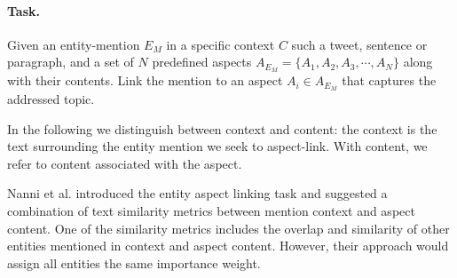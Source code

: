 
\paragraph{\textbf{Task.}} Given an entity-mention $E_M$ in a specific context $C$ such a tweet, sentence or paragraph, and a set of $N$ predefined aspects $A_{E_M} = \{A_1, A_2, A_3, \cdots, A_N\}$ along with their contents. Link the mention to an aspect $A_i \in A_{E_M}$ that captures the addressed topic. 

\bigskip
{}


In the following we distinguish between context and content: the context is the text surrounding the entity mention we seek to aspect-link. With content, we refer to content associated with the aspect.

Nanni et al. \cite{nanni2018entity} introduced the entity aspect linking task and suggested a combination of text similarity metrics between mention context and aspect content. One of the similarity metrics includes the overlap and similarity of other entities mentioned in context and aspect content. However, their approach would assign all entities the same importance weight.

